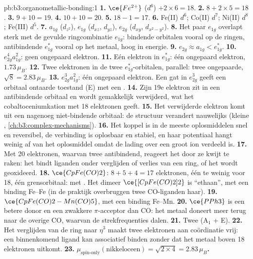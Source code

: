 \begin{solution}{pb:b3:organometallic-bonding:1}
\textbf{1.} $\ce{Fe^{2+}}$ ($d^6$) $+ 2 \times 6 = 18$.
\textbf{2.} $8 + 2 \times 5 = 18$.
\textbf{3.} $9 + 10 = 19$.
\textbf{4.} $10 + 10 = 20$.
\textbf{5.} $18 - 1 = 17$.
\textbf{6.} Fe(II) $d^6$; Co(II) $d^7$; Ni(II) $d^8$; Fe(III) $d^5$.
\textbf{7.} $a_{1g}$ ($d_{z^2}$), $e_{1g}$ ($d_{xz}$, $d_{yz}$), $e_{2g}$ ($d_{xy}$, $d_{x^2-y^2}$).
\textbf{8.} Het paar $e_{1g}$ overlapt sterk met de gevulde ringcombinatie $e_{1g}$: bindende
orbitalen vooral op de ringen, antibindende $e_{1g}^\ast$ vooral op het metaal, hoog in
energie.
\textbf{9.} $e_{2g} \approx a_{1g} < e_{1g}^\ast$.
\textbf{10.} $e_{2g}^4a_{1g}^2$: geen ongepaard elektron.
\textbf{11.} Eén elektron in $e_{1g}^\ast$: één ongepaard elektron, $1.73\,\mu_B$.
\textbf{12.} Twee elektronen in de twee $e_{1g}^\ast$-orbitalen, parallel: twee ongepaarde, $\sqrt{8} =
2.83\,\mu_B$.
\textbf{13.} $e_{2g}^3a_{1g}^2$: één ongepaard elektron. Een gat in $e_{2g}^3$ geeft een orbitaal ontaarde
toestand (E) met een .
\textbf{14.} Zijn 19e elektron zit in een antibindende orbitaal en wordt
gemakkelijk verwijderd, wat het cobaltoceniumkation met 18 elektronen
geeft.
\textbf{15.} Het verwijderde elektron komt uit een nagenoeg niet-bindende
orbitaal: de structuur verandert nauwelijks (kleine , \cref{ch:b3:complex-mechanisms}).
\textbf{16.} Het koppel is in de meeste oplosmiddelen snel en reversibel,
de verbinding is oplosbaar en stabiel, en haar potentiaal hangt weinig af
van het oplosmiddel omdat de lading over een groot ion verdeeld is.
\textbf{17.} Met 20 elektronen, waarvan twee antibindend, reageert het door
ze kwijt te raken: het bindt liganden onder verglijden of verlies van een
ring, of het wordt geoxideerd.
\textbf{18.} $\ce{CpFe(CO)2}$: $8 + 5 + 4 = 17$ elektronen, één te weinig voor 18, één grensorbitaal: 
met . Het dimeer $\ce{[CpFe(CO)2]2}$ is ``ethaan'', met een binding Fe--Fe (in de praktijk overbruggen twee
CO-liganden haar).
\textbf{19.} $\ce{CpFe(CO)2-Mn(CO)5}$, met een binding Fe--Mn.
\textbf{20.} $\ce{PPh3}$ is een betere donor en een zwakkere $\pi$-acceptor dan CO: het metaal doneert
meer terug naar de overige CO, waarvan de strekfrequenties dalen.
\textbf{21.} Twee (A$_1$ + E).
\textbf{22.} Het verglijden van de ring naar $\eta^3$ maakt twee elektronen aan coördinatie vrij: een binnenkomend
ligand kan associatief binden zonder dat het metaal boven 18 elektronen
uitkomt.
\textbf{23.} \textbf{$\mu_{\text{spin-only}}(\text{nikkeloceen}) = \sqrt{2 \times 4} = 2.83\,\mu_B$.}
\end{solution}
